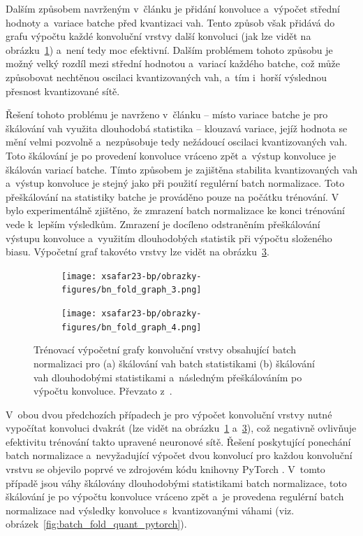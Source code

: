 Dalším způsobem navrženým v~článku \cite{https://doi.org/10.48550/arxiv.1712.05877} je přidání konvoluce a~výpočet střední hodnoty a~variace batche před kvantizaci vah. Tento způsob však přidává do grafu výpočtu každé konvoluční vrstvy další konvoluci (jak lze vidět na obrázku~\ref{fig:batch_fold_quant_1}) a~není tedy moc efektivní. Dalším problémem tohoto způsobu je možný velký rozdíl mezi střední hodnotou a~variací každého batche, což může způsobovat nechtěnou oscilaci kvantizovaných vah, a~tím i~horší výslednou přesnost kvantizované sítě. 

Řešení tohoto problému je navrženo v~článku \cite{krishnamoorthi2018quantizing} -- místo variace batche je pro škálování vah využita dlouhodobá statistika -- klouzavá variace, jejíž hodnota se mění velmi pozvolně a~nezpůsobuje tedy nežádoucí oscilaci kvantizovaných vah. Toto škálování je po provedení konvoluce vráceno zpět a~výstup konvoluce je škálován variací batche. Tímto způsobem je zajištěna stabilita kvantizovaných vah a~výstup konvoluce je stejný jako při použití regulérní batch normalizace. Toto přeškálování na statistiky batche je prováděno pouze na počátku trénování. V~\cite{krishnamoorthi2018quantizing} bylo experimentálně zjištěno, že zmrazení batch normalizace ke konci trénování vede k~lepším výsledkům. Zmrazení je docíleno odstraněním přeškálování výstupu konvoluce a~využitím dlouhodobých statistik při výpočtu složeného biasu. Výpočetní graf takovéto vrstvy lze vidět na obrázku~\ref{fig:batch_fold_quant_2}.

\begin{figure}[H]
\centering
\begin{subfigure}{.45\textwidth}
\centering
\texttt{[image: xsafar23-bp/obrazky-figures/bn\_fold\_graph\_3.png]}
\caption[short]{}
\label{fig:batch_fold_quant_1}
\end{subfigure}
\begin{subfigure}{.45\textwidth}
\centering
\texttt{[image: xsafar23-bp/obrazky-figures/bn\_fold\_graph\_4.png]}
\caption[short]{}
\label{fig:batch_fold_quant_2}
\end{subfigure}
\caption{Trénovací výpočetní grafy konvoluční vrstvy obsahující batch normalizaci pro (a) škálování vah batch statistikami (b) škálování vah dlouhodobými statistikami a~následným přeškálováním po výpočtu konvoluce. Převzato z~\cite{li2022mqbench}.}
\end{figure}

V~obou dvou předchozích případech je pro výpočet konvoluční vrstvy nutné vypočítat konvoluci dvakrát (lze vidět na obrázku~\ref{fig:batch_fold_quant_1} a~\ref{fig:batch_fold_quant_2}), což negativně ovlivňuje efektivitu trénování takto upravené neuronové sítě. Řešení poskytující ponechání batch normalizace a~nevyžadující výpočet dvou konvolucí pro každou konvoluční vrstvu se objevilo poprvé ve zdrojovém kódu knihovny PyTorch \cite{paszke2019pytorch}. V~tomto případě jsou váhy škálovány dlouhodobými statistikami batch normalizace, toto škálování je po výpočtu konvoluce vráceno zpět a~je provedena regulérní batch normalizace nad výsledky konvoluce s~kvantizovanými váhami (viz. obrázek~\ref{fig:batch_fold_quant_pytorch}). 

